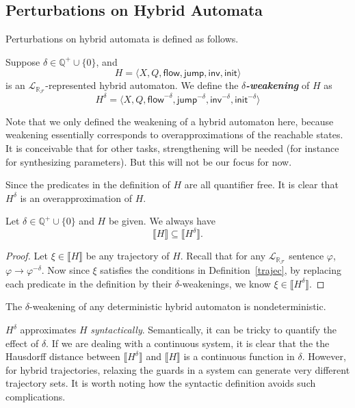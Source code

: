 \documentclass[envcountsect]{llncs}
\newcommand{\flow}{\mathsf{flow}}
\newcommand{\jump}{\mathsf{jump}}
\newcommand{\inv}{\mathsf{inv}}
\newcommand{\init}{\mathsf{init}}
\newcommand{\lrf}{\mathcal{L}_{\mathbb{R}_{\mathcal{F}}}}
\begin{document}
\subsection{Perturbations on Hybrid Automata}
Perturbations on hybrid automata is defined as follows. 

\begin{definition}
Suppose $\delta\in\mathbb{Q}^+\cup\{0\}$, and 
$$H = \langle X, Q, \flow, \jump, \inv, \init\rangle$$
is an $\lrf$-represented hybrid automaton. We define the {\bf \em
$\delta$-weakening} of $H$ as
$$H^{\delta} = \langle X, Q, \flow^{-\delta}, \jump^{-\delta}, \inv^{-\delta},
\init^{-\delta}\rangle$$
\end{definition}

\begin{remark}
Note that we only defined the weakening of a hybrid automaton here, because
weakening essentially corresponds to overapproximations of the reachable states.
It is conceivable that for other tasks, strengthening will be needed (for
instance for synthesizing parameters). But this will not be our focus for now. 
\end{remark}

Since the predicates in the definition of $H$ are all quantifier free. It is
clear that $H^{\delta}$ is an overapproximation of $H$. 
\begin{proposition} Let $\delta\in\mathbb{Q}^+\cup \{0\}$ and $H$ be given. We
always have
$$\llbracket H\rrbracket\subseteq \llbracket H^{\delta}\rrbracket.$$
\end{proposition}
\begin{proof}
Let $\xi\in \llbracket H\rrbracket$ be any trajectory of $H$. Recall that for
any $\lrf$ sentence $\varphi$, $\varphi\rightarrow\varphi^{-\delta}$. Now since
$\xi$ satisfies the conditions in Definition~\ref{trajec}, by replacing each
predicate in the definition by their $\delta$-weakenings, we know $\xi\in
\llbracket H^{\delta}\rrbracket$.
\end{proof}
\begin{remark}
The $\delta$-weakening of any deterministic hybrid automaton is
nondeterministic. 
\end{remark}

\begin{remark}
$H^{\delta}$ approximates $H$ {\em syntactically}. Semantically, it can be
tricky to quantify the effect of $\delta$. If we are dealing with a continuous
system, it is clear that the the Hausdorff distance between $\llbracket
H^{\delta}\rrbracket$ and $\llbracket H\rrbracket$ is a continuous function in
$\delta$. However, for hybrid trajectories, relaxing the guards in a system can
generate very different trajectory sets. It is worth noting how the syntactic
definition avoids such complications. 
\end{remark}
\end{document}
